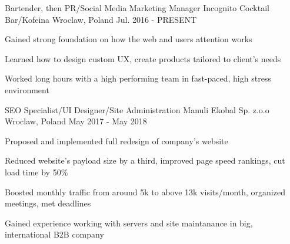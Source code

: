 
\begin{cventries}

  \cventry
    {Bartender, then PR/Social Media Marketing Manager} %
    {Incognito Cocktail Bar/Kofeina} %
    {Wroclaw, Poland} %
    {Jul. 2016 - PRESENT} %
    {
      \begin{cvitems} %
        \item Gained strong foundation on how the web and users attention works
        \item Learned how to design custom UX, create products tailored to client's needs
        \item Worked long hours with a high performing team in fast-paced, high stress environment
      \end{cvitems}
    }

  \cventry
    {SEO Specialist/UI Designer/Site Administration} %
    {Manuli Ekobal Sp. z.o.o} %
    {Wroclaw, Poland} %
    {May 2017 - May 2018} %
    {
      \begin{cvitems} %
      \item Proposed and implemented full redesign of company's website
        \item Reduced website's payload size by a third, improved page speed rankings, cut load time by 50\%
        \item Boosted monthly traffic from around 5k to above 13k visits/month, organized meetings, met deadlines
        \item Gained experience working with servers and site maintanance in big, international B2B company
      \end{cvitems}
    }

\end{cventries}
